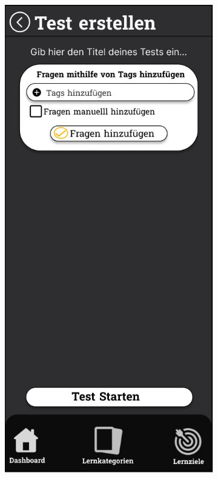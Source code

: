 \newpage

\begin{figure}[htbp]
  \centering
  \begin{subfigure}[b]{0.45\linewidth}
    \centering
    \includegraphics[width=\linewidth]{images/Mockups/TestErstellen.JPG}

\end{subfigure}
\end{figure}
